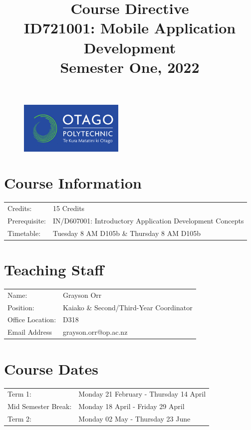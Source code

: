 \documentclass{article}
\author{}
\begin{document}
\begin{figure}
	\includegraphics[width=50mm]{../../resources/img/logo.png}
\end{figure}

\title{Course Directive\\ID721001: Mobile Application Development\\Semester One, 2022}
\date{}
\maketitle

\section*{Course Information}
\begin{tabular}{ll}
	Credits:      & 15 Credits                                              \\
	Prerequisite: & IN/D607001: Introductory Application Development Concepts \\
	Timetable:    & Tuesday 8 AM D105b \& Thursday 8 AM D105b
\end{tabular}

\section*{Teaching Staff}
\begin{tabular}{ll}
	Name:            & Grayson Orr                             \\
	Position:        & Kaiako \& Second/Third-Year Coordinator \\
	Office Location: & D318                                    \\
	Email Address    & grayson.orr@op.ac.nz                    \\
\end{tabular}

\section*{Course Dates}
\begin{tabular}{ll}
	Term 1:             & Monday 21 February - Thursday 14 April \\
	Mid Semester Break: & Monday 18 April - Friday 29 April      \\
	Term 2:             & Monday 02 May - Thursday 23 June       \\
\end{tabular}
\end{document}
